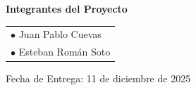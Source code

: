 \documentclass[12pt, a4paper, oneside]{article}
\begin{document}
\begin{titlepage}
    \vspace{1.2cm}
    
    \begin{flushleft}
    {\large\textbf{\textcolor{celesteoscuro}{Integrantes del Proyecto}}}
    
    \vspace{0.4cm}
    
    {\normalsize\textcolor{grisoscuro}{
    \begin{tabular}{l}
        $\bullet$ \quad Juan Pablo Cuevas \\[0.2cm]
        $\bullet$ \quad Esteban Román Soto \\
    \end{tabular}
    }}
    \end{flushleft}
    
    \vfill
    
    {\normalsize\textcolor{celesteoscuro}{Fecha de Entrega: 11 de diciembre de 2025}}
    
\end{titlepage}

\newpage
\tableofcontents
\thispagestyle{empty}

\newpage
\setcounter{page}{1}











\end{document}
